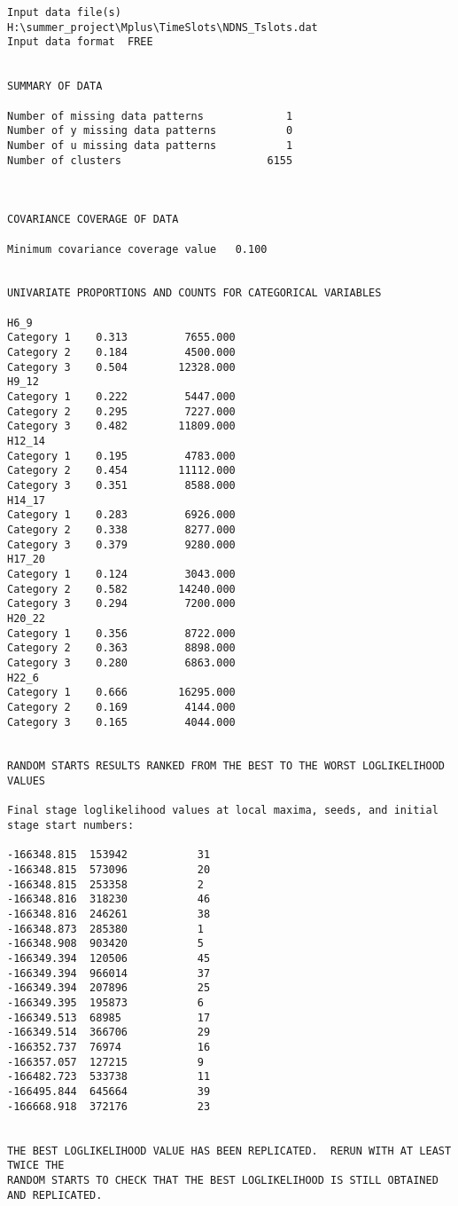 \begin{verbatim}
Input data file(s)
H:\summer_project\Mplus\TimeSlots\NDNS_Tslots.dat
Input data format  FREE


SUMMARY OF DATA

Number of missing data patterns             1
Number of y missing data patterns           0
Number of u missing data patterns           1
Number of clusters                       6155



COVARIANCE COVERAGE OF DATA

Minimum covariance coverage value   0.100


UNIVARIATE PROPORTIONS AND COUNTS FOR CATEGORICAL VARIABLES

H6_9
Category 1    0.313         7655.000
Category 2    0.184         4500.000
Category 3    0.504        12328.000
H9_12
Category 1    0.222         5447.000
Category 2    0.295         7227.000
Category 3    0.482        11809.000
H12_14
Category 1    0.195         4783.000
Category 2    0.454        11112.000
Category 3    0.351         8588.000
H14_17
Category 1    0.283         6926.000
Category 2    0.338         8277.000
Category 3    0.379         9280.000
H17_20
Category 1    0.124         3043.000
Category 2    0.582        14240.000
Category 3    0.294         7200.000
H20_22
Category 1    0.356         8722.000
Category 2    0.363         8898.000
Category 3    0.280         6863.000
H22_6
Category 1    0.666        16295.000
Category 2    0.169         4144.000
Category 3    0.165         4044.000


RANDOM STARTS RESULTS RANKED FROM THE BEST TO THE WORST LOGLIKELIHOOD VALUES

Final stage loglikelihood values at local maxima, seeds, and initial stage start numbers:

-166348.815  153942           31
-166348.815  573096           20
-166348.815  253358           2
-166348.816  318230           46
-166348.816  246261           38
-166348.873  285380           1
-166348.908  903420           5
-166349.394  120506           45
-166349.394  966014           37
-166349.394  207896           25
-166349.395  195873           6
-166349.513  68985            17
-166349.514  366706           29
-166352.737  76974            16
-166357.057  127215           9
-166482.723  533738           11
-166495.844  645664           39
-166668.918  372176           23


THE BEST LOGLIKELIHOOD VALUE HAS BEEN REPLICATED.  RERUN WITH AT LEAST TWICE THE
RANDOM STARTS TO CHECK THAT THE BEST LOGLIKELIHOOD IS STILL OBTAINED AND REPLICATED.



\end{verbatim}
